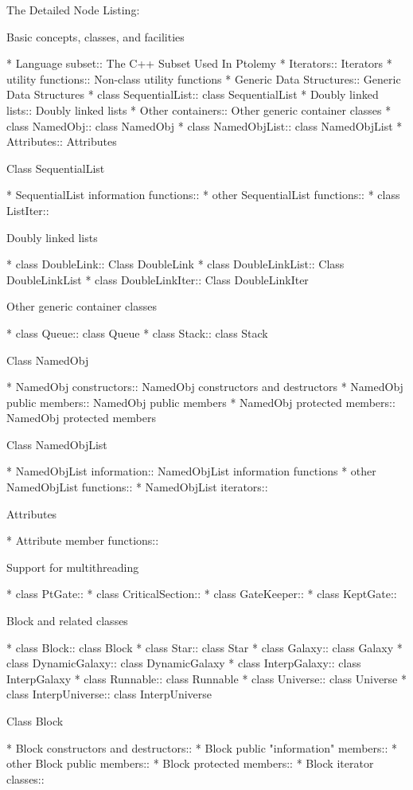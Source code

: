 The Detailed Node Listing:

Basic concepts, classes, and facilities

* Language subset::  The C++ Subset Used In Ptolemy
* Iterators::       Iterators
* utility functions::  Non-class utility functions
* Generic Data Structures::  Generic Data Structures
* class SequentialList::  class SequentialList
* Doubly linked lists::  Doubly linked lists
* Other containers::  Other generic container classes
* class NamedObj::  class NamedObj
* class NamedObjList::  class NamedObjList
* Attributes::      Attributes

Class SequentialList

* SequentialList information functions::  
* other SequentialList functions::  
* class ListIter::  

Doubly linked lists

* class DoubleLink::  Class DoubleLink
* class DoubleLinkList::  Class DoubleLinkList
* class DoubleLinkIter::  Class DoubleLinkIter

Other generic container classes

* class Queue::     class Queue
* class Stack::     class Stack

Class NamedObj

* NamedObj constructors::  NamedObj constructors and destructors
* NamedObj public members::  NamedObj public members
* NamedObj protected members::  NamedObj protected members

Class NamedObjList

* NamedObjList information::  NamedObjList information functions
* other NamedObjList functions::  
* NamedObjList iterators::  

Attributes

* Attribute member functions::  

Support for multithreading

* class PtGate::    
* class CriticalSection::  
* class GateKeeper::  
* class KeptGate::  

Block and related classes

* class Block::     class Block
* class Star::      class Star
* class Galaxy::    class Galaxy
* class DynamicGalaxy::  class DynamicGalaxy
* class InterpGalaxy::  class InterpGalaxy
* class Runnable::  class Runnable
* class Universe::  class Universe
* class InterpUniverse::  class InterpUniverse

Class Block

* Block constructors and destructors::  
* Block public "information" members::  
* other Block public members::  
* Block protected members::  
* Block iterator classes::  

